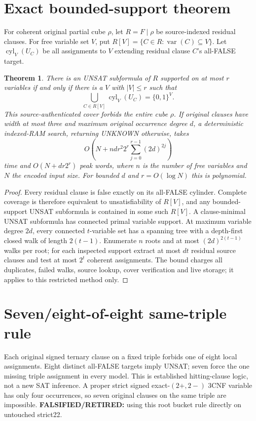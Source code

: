 \documentclass{article}
\newtheorem{theorem}{Theorem}
\begin{document}
\section{Exact bounded-support theorem}
For coherent original partial cube $\rho$, let $R=F\mid\rho$ be source-indexed residual clauses.
For free variable set $V$, put $R[V]=\{C\in R:\operatorname{var}(C)\subseteq V\}$.
Let $\operatorname{cyl}_V(U_C)$ be all assignments to $V$ extending residual clause $C$'s all-FALSE target.
\begin{theorem}
There is an UNSAT subformula of $R$ supported on at most $r$ variables if and only if
there is a $V$ with $|V|\le r$ such that
\[
\bigcup_{C\in R[V]}\operatorname{cyl}_V(U_C)=\{0,1\}^V.
\]
This source-authenticated cover forbids the entire cube $\rho$.
If original clauses have width at most three and maximum original occurrence degree $d$, a deterministic indexed-RAM search, returning UNKNOWN otherwise, takes
\[
O\left(N+ndr^2 2^r\sum_{j=0}^{r-1}(2d)^{2j}\right)
\]
time and $O(N+dr2^r)$ peak words, where $n$ is the number of free variables and $N$ the encoded input size.
For bounded $d$ and $r=O(\log N)$ this is polynomial.
\end{theorem}
\begin{proof}
Every residual clause is false exactly on its all-FALSE cylinder.
Complete coverage is therefore equivalent to unsatisfiability of $R[V]$, and any bounded-support UNSAT subformula is contained in some such $R[V]$.
A clause-minimal UNSAT subformula has connected primal variable support.
At maximum variable degree $2d$, every connected $t$-variable set has a spanning tree with a depth-first closed walk of length $2(t-1)$.
Enumerate $n$ roots and at most $(2d)^{2(t-1)}$ walks per root; for each inspected support extract at most $dt$ residual source clauses and test at most $2^t$ coherent assignments.
The bound charges all duplicates, failed walks, source lookup, cover verification and live storage; it applies to this restricted method only.
\end{proof}
\section{Seven/eight-of-eight same-triple rule}
Each original signed ternary clause on a fixed triple forbids one of eight local assignments.
Eight distinct all-FALSE targets imply UNSAT; seven force the one missing triple assignment in every model.
This is established hitting-clause logic, not a new SAT inference.
A proper strict signed exact-$(2+,2-)$ 3CNF variable has only four occurrences, so seven original clauses on the same triple are impossible.
\textbf{FALSIFIED/RETIRED:} using this root bucket rule directly on untouched strict22.
\end{document}
